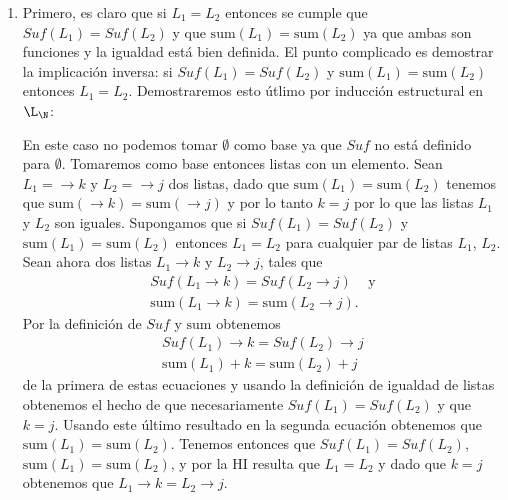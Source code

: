 \begin{teorema}
\begin{demostracion}
\begin{enumerate}
\begin{inducciondemo}
		Si $\max(L\rightarrow k)=k$ tenemos que
		  \[
		  \max(L\rightarrow k)\;\;=\;\;k\;\stackrel{\text{(1.)}}{\leq}\;\;\text{sum}(L) + k\;\;=\;\;\text{sum}(L\rightarrow k)
		  \]
		
		En cualquier caso se cumple que $\max(L\rightarrow k)\leq\text{sum}(L\rightarrow k)$, luego por inducción estructural se sigue que la propiedad se cumple para todas las listas.
	\end{inducciondemo}
	\setcounter{enumi}{3}
	\item Primero, es claro que si $L_1=L_2$ entonces se cumple que $Suf(L_1)=Suf(L_2)$ y que $\text{sum}(L_1)=\text{sum}(L_2)$ ya que ambas son funciones y la igualdad está bien definida.
	El punto complicado es demostrar la implicación inversa: si $Suf(L_1)=Suf(L_2)$ y $\text{sum}(L_1)=\text{sum}(L_2)$ entonces $L_1=L_2$.
	Demostraremos esto útlimo por inducción estructural en $\L_\N$:
	\begin{inducciondemo}
	  \BI En este caso no podemos tomar $\emptyset$ como base ya que $Suf$ no está definido para $\emptyset$.
	  Tomaremos como base entonces listas con un elemento.
	  Sean $L_1=\rightarrow k$ y $L_2=\rightarrow j$ dos listas, dado que $\text{sum}(L_1)=\text{sum}(L_2)$ tenemos que $\text{sum}(\rightarrow k)=\text{sum}(\rightarrow j)$ y por lo tanto $k=j$ por lo que las listas $L_1$ y $L_2$ son iguales.
	  \HI Supongamos que si $Suf(L_1)=Suf(L_2)$ y $\text{sum}(L_1)=\text{sum}(L_2)$ entonces $L_1=L_2$ para cualquier par de listas $L_1$, $L_2$.
	  \TI Sean ahora dos listas $L_1\rightarrow k$ y $L_2\rightarrow j$, tales que
	  \[
	  \begin{array}{l}
	  Suf(L_1\rightarrow k)=Suf(L_2\rightarrow j) \;\;\;\text{ y} \\
	  \text{sum}(L_1\rightarrow k)=\text{sum}(L_2\rightarrow j)\text{.}
	  \end{array}
	  \]
	  Por la definición de $Suf$ y $\text{sum}$ obtenemos 
	  \[
	  \begin{array}{l}
	  Suf(L_1)\rightarrow k = Suf(L_2)\rightarrow j \\
	  \text{sum}(L_1)+k=\text{sum}(L_2)+j
	  \end{array}
	  \]
	  de la primera de estas ecuaciones y usando la definición de igualdad de listas obtenemos el hecho de que necesariamente $Suf(L_1)=Suf(L_2)$ y que $k=j$.
	  Usando este último resultado en la segunda ecuación obtenemos que $\text{sum}(L_1)=\text{sum}(L_2)$.
	  Tenemos entonces que $Suf(L_1)=Suf(L_2)$, $\text{sum}(L_1)=\text{sum}(L_2)$, y por la HI resulta que $L_1=L_2$ y dado que $k=j$ obtenemos que $L_1\rightarrow k=L_2\rightarrow j$.
	\end{inducciondemo}
\end{enumerate}
\end{demostracion}
\end{teorema}

